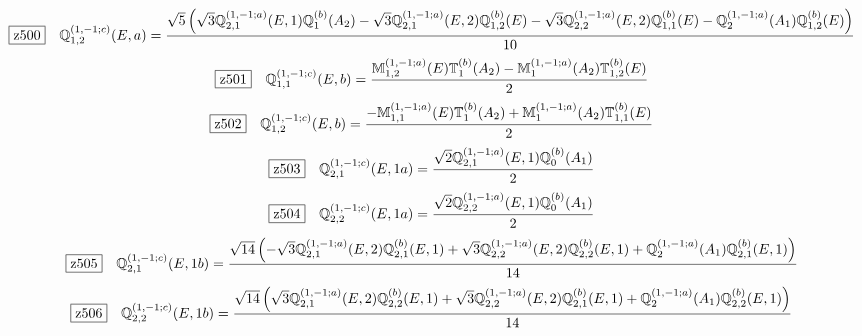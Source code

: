 \documentclass[fleqn,10pt,landscape]{jsarticle}
\begin{document}
\begin{dmath*}
\hspace*{3mm}\fbox{z500}\quad \mathbb{Q}_{1,2}^{(1,-1;c)}(E,a)=\frac{\sqrt{5} \left(\sqrt{3} \mathbb{Q}_{2,1}^{(1,-1;a)}(E,1) \mathbb{Q}_{1}^{(b)}(A_{2}) - \sqrt{3} \mathbb{Q}_{2,1}^{(1,-1;a)}(E,2) \mathbb{Q}_{1,2}^{(b)}(E) - \sqrt{3} \mathbb{Q}_{2,2}^{(1,-1;a)}(E,2) \mathbb{Q}_{1,1}^{(b)}(E) - \mathbb{Q}_{2}^{(1,-1;a)}(A_{1}) \mathbb{Q}_{1,2}^{(b)}(E)\right)}{10}
\end{dmath*}
\begin{dmath*}
\hspace*{3mm}\fbox{z501}\quad \mathbb{Q}_{1,1}^{(1,-1;c)}(E,b)=\frac{\mathbb{M}_{1,2}^{(1,-1;a)}(E) \mathbb{T}_{1}^{(b)}(A_{2}) - \mathbb{M}_{1}^{(1,-1;a)}(A_{2}) \mathbb{T}_{1,2}^{(b)}(E)}{2}
\end{dmath*}
\begin{dmath*}
\hspace*{3mm}\fbox{z502}\quad \mathbb{Q}_{1,2}^{(1,-1;c)}(E,b)=\frac{- \mathbb{M}_{1,1}^{(1,-1;a)}(E) \mathbb{T}_{1}^{(b)}(A_{2}) + \mathbb{M}_{1}^{(1,-1;a)}(A_{2}) \mathbb{T}_{1,1}^{(b)}(E)}{2}
\end{dmath*}
\begin{dmath*}
\hspace*{3mm}\fbox{z503}\quad \mathbb{Q}_{2,1}^{(1,-1;c)}(E,1a)=\frac{\sqrt{2} \mathbb{Q}_{2,1}^{(1,-1;a)}(E,1) \mathbb{Q}_{0}^{(b)}(A_{1})}{2}
\end{dmath*}
\begin{dmath*}
\hspace*{3mm}\fbox{z504}\quad \mathbb{Q}_{2,2}^{(1,-1;c)}(E,1a)=\frac{\sqrt{2} \mathbb{Q}_{2,2}^{(1,-1;a)}(E,1) \mathbb{Q}_{0}^{(b)}(A_{1})}{2}
\end{dmath*}
\begin{dmath*}
\hspace*{3mm}\fbox{z505}\quad \mathbb{Q}_{2,1}^{(1,-1;c)}(E,1b)=\frac{\sqrt{14} \left(- \sqrt{3} \mathbb{Q}_{2,1}^{(1,-1;a)}(E,2) \mathbb{Q}_{2,1}^{(b)}(E,1) + \sqrt{3} \mathbb{Q}_{2,2}^{(1,-1;a)}(E,2) \mathbb{Q}_{2,2}^{(b)}(E,1) + \mathbb{Q}_{2}^{(1,-1;a)}(A_{1}) \mathbb{Q}_{2,1}^{(b)}(E,1)\right)}{14}
\end{dmath*}
\begin{dmath*}
\hspace*{3mm}\fbox{z506}\quad \mathbb{Q}_{2,2}^{(1,-1;c)}(E,1b)=\frac{\sqrt{14} \left(\sqrt{3} \mathbb{Q}_{2,1}^{(1,-1;a)}(E,2) \mathbb{Q}_{2,2}^{(b)}(E,1) + \sqrt{3} \mathbb{Q}_{2,2}^{(1,-1;a)}(E,2) \mathbb{Q}_{2,1}^{(b)}(E,1) + \mathbb{Q}_{2}^{(1,-1;a)}(A_{1}) \mathbb{Q}_{2,2}^{(b)}(E,1)\right)}{14}
\end{dmath*}
\end{document}

